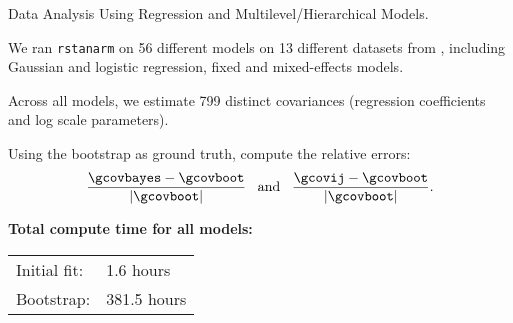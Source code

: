 \begin{frame}{Data Analysis Using Regression and Multilevel/Hierarchical Models.}

\begin{minipage}{0.49\textwidth}

We ran \texttt{rstanarm} on 56 different models on 13 different datasets
from \citet{gelman:2006:arm},
including Gaussian and logistic regression, fixed and mixed-effects models.

\spskip Across all models, we estimate 799 distinct covariances (regression
coefficients and log scale parameters).

\spskip
Using the bootstrap as ground truth, compute the relative errors:
%
\begin{align*}
%
\frac{\gcovbayes - \gcovboot}{|\gcovboot|}
\,\,\,
\textrm{ and }
\,\,\,
\frac{\gcovij - \gcovboot}{|\gcovboot|}.
%
\end{align*}
%
\end{minipage}
\begin{minipage}{0.49\textwidth}
    \ARMRelFig{}
    \textbf{Total compute time for all models:}

    \begin{tabular}{ll}
    Initial fit: & 1.6 hours \\
    Bootstrap: & 381.5 hours\\
    \end{tabular}
\end{minipage}

\end{frame}
